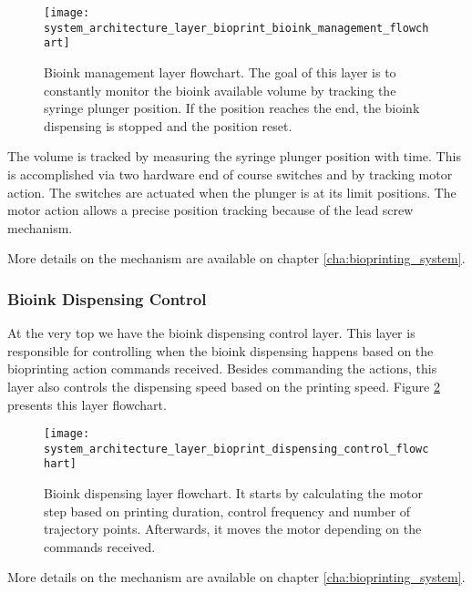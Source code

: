 \begin{figure}[htbp]
	\centering
	\texttt{[image: system\_architecture\_layer\_bioprint\_bioink\_management\_flowchart]}
	\caption{Bioink management layer flowchart. The goal of this layer is to constantly monitor the bioink available volume by tracking the syringe plunger position. If the position reaches the end, the bioink dispensing is stopped and the position reset.}
	\label{fig:system_architecture_layer_bioprint_bioink_management_flowchart}
\end{figure}

The volume is tracked by measuring the syringe plunger position with time. This is accomplished via two hardware end of course switches and by tracking motor action. The switches are actuated when the plunger is at its limit positions. The motor action allows a precise position tracking because of the lead screw mechanism. 

More details on the mechanism are available on chapter \ref{cha:bioprinting_system}.


\subsubsection*{Bioink Dispensing Control}
\label{subsubsec:system_architectural_printhead_layers_bioink_dispensing_control}

At the very top we have the bioink dispensing control layer. This layer is responsible for controlling when the bioink dispensing happens based on the bioprinting action commands received. Besides commanding the actions, this layer also controls the dispensing speed based on the printing speed. Figure \ref{fig:system_architecture_layer_bioprint_dispensing_control_flowchart} presents this layer flowchart.

\begin{figure}[htbp]
	\centering
	\texttt{[image: system\_architecture\_layer\_bioprint\_dispensing\_control\_flowchart]}
	\caption{Bioink dispensing layer flowchart. It starts by calculating the motor step based on printing duration, control frequency and number of trajectory points. Afterwards, it moves the motor depending on the commands received.}
	\label{fig:system_architecture_layer_bioprint_dispensing_control_flowchart}
\end{figure}

More details on the mechanism are available on chapter \ref{cha:bioprinting_system}.


